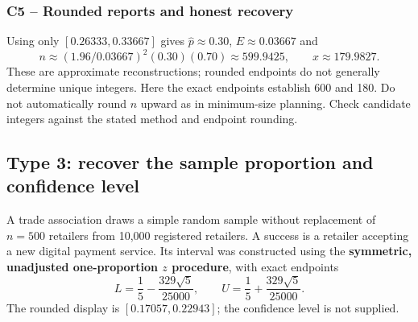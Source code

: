 \subsubsection*{C5 -- Rounded reports and honest recovery}\label{sol:c5-2-b}
Using only $[0.26333,0.33667]$ gives $\hat p\approx0.30$, $E\approx0.03667$ and
\[
n\approx(1.96/0.03667)^2(0.30)(0.70)\approx599.9425,
\qquad x\approx179.9827.
\]
These are approximate reconstructions; rounded endpoints do not generally determine unique integers. Here the exact endpoints establish 600 and 180. Do not automatically round $n$ upward as in minimum-size planning. Check candidate integers against the stated method and endpoint rounding.
\clearpage

\subsection{Type 3: recover the sample proportion and confidence level}\label{prob:c5-3}
A trade association draws a simple random sample without replacement of $n=500$ retailers from 10,000 registered retailers. A success is a retailer accepting a new digital payment service. Its interval was constructed using the \textbf{symmetric, unadjusted one-proportion $z$ procedure}, with exact endpoints
\[
L=\frac15-\frac{329\sqrt5}{25000},\qquad
U=\frac15+\frac{329\sqrt5}{25000}.
\]
The rounded display is $[0.17057,0.22943]$; the confidence level is not supplied.
